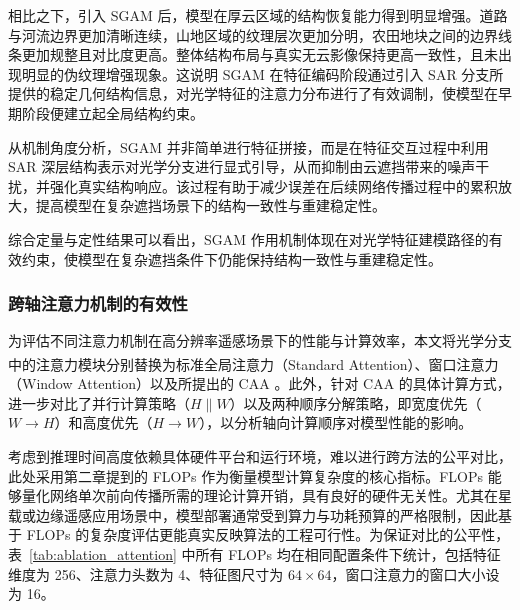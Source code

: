 相比之下，引入 SGAM 后，模型在厚云区域的结构恢复能力得到明显增强。道路与河流边界更加清晰连续，山地区域的纹理层次更加分明，农田地块之间的边界线条更加规整且对比度更高。整体结构布局与真实无云影像保持更高一致性，且未出现明显的伪纹理增强现象。这说明 SGAM 在特征编码阶段通过引入 SAR 分支所提供的稳定几何结构信息，对光学特征的注意力分布进行了有效调制，使模型在早期阶段便建立起全局结构约束。

从机制角度分析，SGAM 并非简单进行特征拼接，而是在特征交互过程中利用 SAR 深层结构表示对光学分支进行显式引导，从而抑制由云遮挡带来的噪声干扰，并强化真实结构响应。该过程有助于减少误差在后续网络传播过程中的累积放大，提高模型在复杂遮挡场景下的结构一致性与重建稳定性。

综合定量与定性结果可以看出，SGAM 作用机制体现在对光学特征建模路径的有效约束，使模型在复杂遮挡条件下仍能保持结构一致性与重建稳定性。

\subsubsection{跨轴注意力机制的有效性}

为评估不同注意力机制在高分辨率遥感场景下的性能与计算效率，本文将光学分支中的注意力模块分别替换为标准全局注意力\textsuperscript{\cite{dosovitskiy2020image}}（Standard Attention）、窗口注意力\textsuperscript{\cite{liu2021swin}}（Window Attention）以及所提出的 CAA 。此外，针对 CAA 的具体计算方式，进一步对比了并行计算策略（$H \parallel W$）以及两种顺序分解策略，即宽度优先（$W\rightarrow H$）和高度优先（$H\rightarrow W$），以分析轴向计算顺序对模型性能的影响。

考虑到推理时间高度依赖具体硬件平台和运行环境，难以进行跨方法的公平对比，此处采用第二章提到的 FLOPs 作为衡量模型计算复杂度的核心指标。FLOPs 能够量化网络单次前向传播所需的理论计算开销，具有良好的硬件无关性。尤其在星载或边缘遥感应用场景中，模型部署通常受到算力与功耗预算的严格限制，因此基于 FLOPs 的复杂度评估更能真实反映算法的工程可行性。为保证对比的公平性，表~\ref{tab:ablation_attention} 中所有 FLOPs 均在相同配置条件下统计，包括特征维度为 256、注意力头数为 4、特征图尺寸为 $64\times64$，窗口注意力的窗口大小设为 16。

